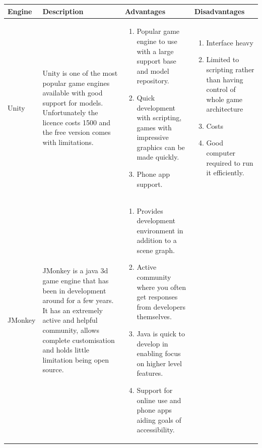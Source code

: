 \begin{table}[H]
    \begin{tabular}{| p{2cm} | p{4cm} | p{6cm} | p{5cm}| }
    \hline
    Engine & Description & Advantages & Disadvantages \\ \hline
    Unity & Unity is one of the most popular game engines available with good support for models. Unfortunately the licence costs 1500 and the free version comes with limitations. & \begin{minipage}{6cm}
    \vskip 4pt
    \begin{enumerate}
   \item Popular game engine to use with a large support base and model repository. 
   \item Quick development with scripting, games with impressive graphics can be made quickly. 
   \item Phone app support.
   \end{enumerate}
   \vskip 4pt
 \end{minipage}   & 
 \begin{minipage}{5cm}
    \vskip 4pt
    \begin{enumerate}
   \item Interface heavy 
   \item Limited to scripting rather than having control of whole game architecture
   \item Costs 
   \item Good computer required to run it efficiently.
   \end{enumerate}
   \vskip 4pt
 \end{minipage}
	\\ \hline
	JMonkey & JMonkey is a java 3d game engine that has been in development around for a few years. It has an extremely active and helpful community, allows complete customisation and holds little limitation being open source.  &
	 \begin{minipage}{6cm}
    \vskip 4pt
    \begin{enumerate}
   \item Provides development environment in addition to a scene graph.
   \item Active community where you often get responses from developers themselves.
   \item Java is quick to develop in enabling focus on higher level features.
   \item Support for online use and phone apps aiding goals of accessibility.  
   \end{enumerate}

\end{minipage}
\end{tabular}
\end{table}
